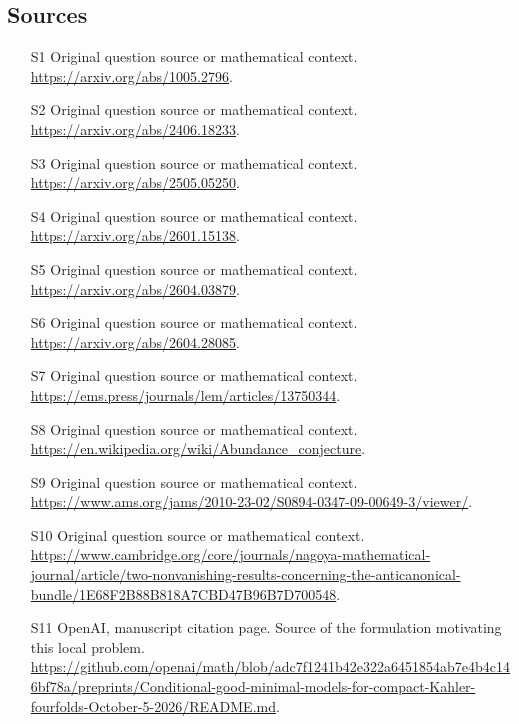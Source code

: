 \documentclass[11pt]{article}
\begin{document}
\subsection{Sources}
\begin{itemize}
\item[S1] Original question source or mathematical context.
\url{https://arxiv.org/abs/1005.2796}.
\item[S2] Original question source or mathematical context.
\url{https://arxiv.org/abs/2406.18233}.
\item[S3] Original question source or mathematical context.
\url{https://arxiv.org/abs/2505.05250}.
\item[S4] Original question source or mathematical context.
\url{https://arxiv.org/abs/2601.15138}.
\item[S5] Original question source or mathematical context.
\url{https://arxiv.org/abs/2604.03879}.
\item[S6] Original question source or mathematical context.
\url{https://arxiv.org/abs/2604.28085}.
\item[S7] Original question source or mathematical context.
\url{https://ems.press/journals/lem/articles/13750344}.
\item[S8] Original question source or mathematical context.
\url{https://en.wikipedia.org/wiki/Abundance_conjecture}.
\item[S9] Original question source or mathematical context.
\url{https://www.ams.org/jams/2010-23-02/S0894-0347-09-00649-3/viewer/}.
\item[S10] Original question source or mathematical context.
\url{https://www.cambridge.org/core/journals/nagoya-mathematical-journal/article/two-nonvanishing-results-concerning-the-anticanonical-bundle/1E68F2B88B818A7CBD47B96B7D700548}.
\item[S11] OpenAI, manuscript citation page. Source of the formulation motivating this local problem.
\url{https://github.com/openai/math/blob/adc7f1241b42e322a6451854ab7e4b4c146bf78a/preprints/Conditional-good-minimal-models-for-compact-Kahler-fourfolds-October-5-2026/README.md}.
\end{itemize}
\end{document}
